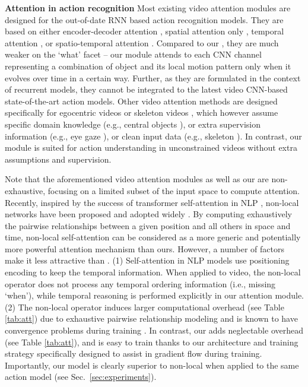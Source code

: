 \documentclass[runningheads]{llncs}
\newcommand{\keypoint}[1]{\vspace{0.1cm}\noindent\textbf{#1}\quad}
\begin{document}
\keypoint{Attention in action recognition}
Most existing video attention modules are designed for the out-of-date RNN based  action recognition models.  They are based on  either
encoder-decoder attention
\cite{du2017recurrent,li2018videolstm,meng2019interpretable,torabi2017action,wang2018action,wang2016hierarchical},
spatial attention only \cite{girdhar2017attentional,sharma2016action,wang2016hierarchical},
temporal attention \cite{torabi2017action,wang2018action},
or spatio-temporal attention \cite{du2017recurrent,li2018videolstm,meng2019interpretable,wang2016hierarchical}.
Compared to our \shortname{}, they are much weaker on the `what' facet -- our module attends to each CNN channel representing a combination of object and its local motion pattern only  when it evolves over time in a certain way. Further,   as they are formulated in the context of recurrent models, they cannot be integrated to 
the latest video CNN-based state-of-the-art action models. 
Other video attention methods are designed specifically 
for egocentric videos \cite{li2018eye,sudhakaran2018attention}
or skeleton videos \cite{si2019attention,song2017end,yang2018action}, 
which however assume specific domain knowledge (e.g., central objects \cite{sudhakaran2018attention}),
or extra supervision information (e.g., eye gaze \cite{li2018eye}),
or clean input data (e.g., skeleton \cite{si2019attention,song2017end,yang2018action}).
In contrast, our module is suited for  action understanding
in unconstrained videos without extra assumptions and supervision. 


Note that the aforementioned video attention modules as well as our \shortname{} are non-exhaustive, 
focusing on a limited subset of the input space to compute attention. Recently, inspired by the success of transformer self-attention in NLP \cite{devlin-etal-2019-bert,vaswani2017attention}, non-local networks have been proposed \cite{wang2018non} and adopted widely \cite{girdhar2019video,lin2019tsm,Tran2019channel-separated}. 
By computing exhaustively the pairwise relationships between a given position and all others in space and time, 
non-local self-attention can be considered as a more generic and potentially more powerful attention mechanism than ours. 
However, a number of factors make it less attractive than \shortname{}. 
(1) Self-attention in NLP models use positioning encoding to keep the temporal information. When applied to video, the
non-local operator does not process any temporal ordering information (i.e., missing `when'), while temporal reasoning is performed explicitly in our attention module. 
(2) The non-local operator induces larger computational overhead  (see Table \ref{tab:att}) due to exhaustive pairwise relationship modeling and is known to have  convergence problems during training \cite{Tao2018nonlocalproblem}. 
In contrast, our \shortname{} adds neglectable overhead (see Table \ref{tab:att}), and is easy to train thanks to our architecture and training strategy specifically designed to assist in gradient flow during training. 
Importantly, our model is clearly superior to non-local when applied to the same action model (see Sec.~\ref{sec:experiments}). 
\end{document}
